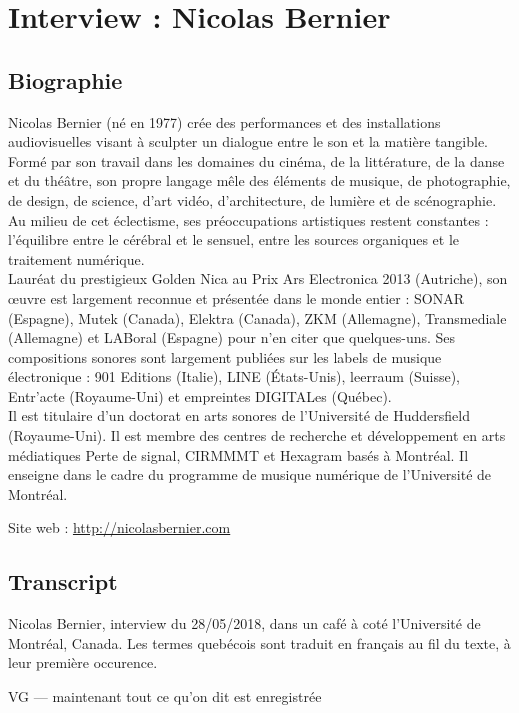 \chapter{Interview : Nicolas Bernier}
\label{appendix:bernier}

\section*{Biographie}

\noindent Nicolas Bernier (né en 1977) crée des performances et des installations audiovisuelles visant à sculpter un dialogue entre le son et la matière tangible. Formé par son travail dans les domaines du cinéma, de la littérature, de la danse et du théâtre, son propre langage mêle des éléments de musique, de photographie, de design, de science, d'art vidéo, d'architecture, de lumière et de scénographie. Au milieu de cet éclectisme, ses préoccupations artistiques restent constantes : l'équilibre entre le cérébral et le sensuel, entre les sources organiques et le traitement numérique.\\
\indent Lauréat du prestigieux Golden Nica au Prix Ars Electronica 2013 (Autriche), son œuvre est largement reconnue et présentée dans le monde entier : SONAR (Espagne), Mutek (Canada), Elektra (Canada), ZKM (Allemagne), Transmediale (Allemagne) et LABoral (Espagne) pour n'en citer que quelques-uns. Ses compositions sonores sont largement publiées sur les labels de musique électronique : 901 Editions (Italie), LINE (États-Unis), leerraum (Suisse), Entr'acte (Royaume-Uni) et empreintes DIGITALes (Québec).\\
\indent Il est titulaire d'un doctorat en arts sonores de l'Université de Huddersfield (Royaume-Uni). Il est membre des centres de recherche et développement en arts médiatiques Perte de signal, CIRMMMT et Hexagram basés à Montréal. Il enseigne dans le cadre du programme de musique numérique de l'Université de Montréal.

\noindent Site web : \url{http://nicolasbernier.com}

\section*{Transcript}

\noindent Nicolas Bernier, interview du 28/05/2018, dans un café à coté l'Université de Montréal, Canada. Les termes quebécois sont traduit en français au fil du texte, à leur première occurence.
 
VG — maintenant tout ce qu'on dit est enregistrée 

